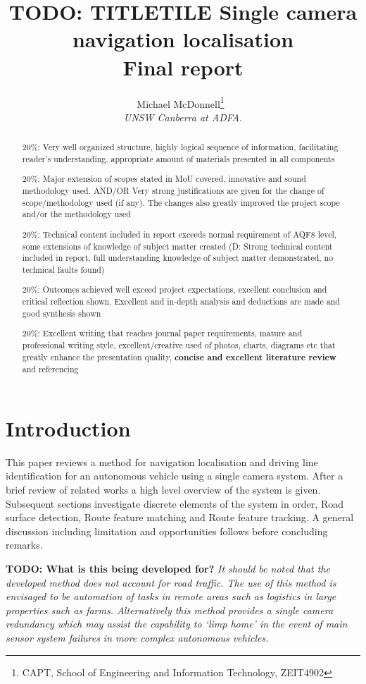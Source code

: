 \documentclass[]{aiaa-tc}%
\title{TODO: TITLETILE Single camera navigation localisation\\ Final report}
\author{
  Michael McDonnell\thanks{CAPT, School of Engineering and Information Technology, ZEIT4902}\
  \\
  {\normalsize\itshape
   UNSW Canberra at ADFA.}\\
  }
\begin{document}
\maketitle


\begin{abstract}
20\%: Very well organized structure, highly logical sequence of information, facilitating reader’s understanding, appropriate amount of materials presented in all components

20\%: Major extension of scopes stated in MoU covered, innovative and sound methodology used. AND/OR Very strong justifications are given for the change of scope/methodology used (if any). The changes also greatly improved the project scope and/or the methodology used

20\%: Technical content included in report exceeds normal requirement of AQF8 level, some extensions of knowledge of subject matter created
(D: Strong technical content included in report, full understanding knowledge of subject matter demonstrated, no technical faults found)

20\%: Outcomes achieved well exceed project expectations, excellent conclusion and critical reflection shown. Excellent and in‐depth analysis and deductions are made and good synthesis shown

20\%: Excellent writing that reaches journal paper requirements, mature and professional writing style, excellent/creative used of photos, charts, diagrams etc that greatly enhance the presentation quality, \textbf{concise and excellent literature review }and referencing
\end{abstract}


\newpage
\section{Introduction} \label{sect:intro}

This paper reviews a method for navigation localisation and driving line identification for an autonomous vehicle using a single camera system. After a brief review of related works a high level overview of the system is given. Subsequent sections investigate discrete elements of the system in order, Road surface detection, Route feature matching and Route feature tracking. A general discussion including limitation and opportunities follows before concluding remarks.

\textbf{TODO: What is this being developed for? }\textit{It should be noted that the developed method does not account for road traffic. The use of this method is envisaged to be automation of tasks in remote areas such as logistics in large properties such as farms. Alternatively this method provides a single camera redundancy which may assist the capability to `limp home' in the event of main sensor system failures in more complex autonomous vehicles.}
\end{document}

